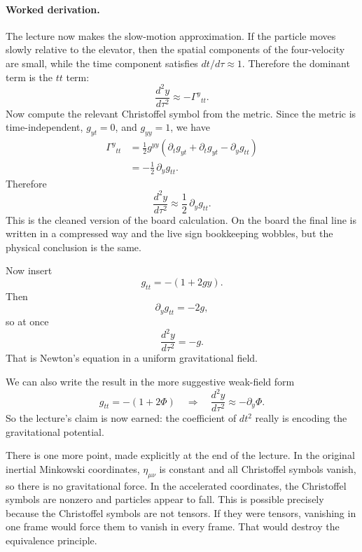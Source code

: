 \paragraph{Worked derivation.}
The lecture now makes the slow-motion approximation. If the particle moves slowly relative to the elevator, then the spatial components of the four-velocity are small, while the time component satisfies \(dt/d\tau\approx 1\). Therefore the dominant term is the \(tt\) term:
\begin{equation}
\frac{d^2y}{d\tau^2}\approx -\Gamma^{y}{}_{tt}.
\end{equation}
Now compute the relevant Christoffel symbol from the metric. Since the metric is time-independent, \(g_{yt}=0\), and \(g_{yy}=1\), we have
\begin{align}
\Gamma^{y}{}_{tt}
&=
\frac{1}{2}g^{yy}
\left(
\partial_t g_{yt}
+\partial_t g_{yt}
-\partial_y g_{tt}
\right) \\
&=
-\frac{1}{2}\,\partial_y g_{tt}.
\end{align}
Therefore
\begin{equation}
\frac{d^2y}{d\tau^2}
\approx
\frac{1}{2}\,\partial_y g_{tt}.
\end{equation}
This is the cleaned version of the board calculation. On the board the final line is written in a compressed way and the live sign bookkeeping wobbles, but the physical conclusion is the same.

Now insert
\begin{equation}
g_{tt}=-(1+2gy).
\end{equation}
Then
\begin{equation}
\partial_y g_{tt}=-2g,
\end{equation}
so at once
\begin{equation}
\frac{d^2y}{d\tau^2}=-g.
\end{equation}
That is Newton's equation in a uniform gravitational field.

We can also write the result in the more suggestive weak-field form
\begin{equation}
g_{tt}=-(1+2\Phi)
\quad \Longrightarrow \quad
\frac{d^2y}{d\tau^2}\approx -\partial_y\Phi.
\end{equation}
So the lecture's claim is now earned: the coefficient of \(dt^2\) really is encoding the gravitational potential.

There is one more point, made explicitly at the end of the lecture. In the original inertial Minkowski coordinates, \(\eta_{\mu\nu}\) is constant and all Christoffel symbols vanish, so there is no gravitational force. In the accelerated coordinates, the Christoffel symbols are nonzero and particles appear to fall. This is possible precisely because the Christoffel symbols are not tensors. If they were tensors, vanishing in one frame would force them to vanish in every frame. That would destroy the equivalence principle.

